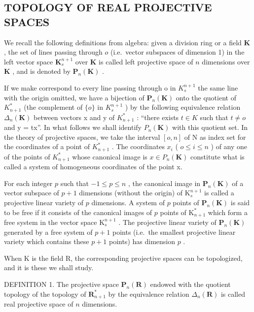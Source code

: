 \subsection{TOPOLOGY OF REAL PROJECTIVE SPACES}

We recall the following definitions from algebra: given a division ring or a field \(\mathbf{K}\) , the set of lines passing through \(o\) (i.e.~vector subspaces of dimension 1) in the left vector space \(\mathbf{K}_s^{n+1}\) over \(\mathbf{K}\) is called left projective space of \(n\) dimensions over \(\mathbf{K}\) , and is denoted by \(\mathbf{P}_n(\mathbf{K})\) .

If we make correspond to every line passing through o in \(K_{s}^{n+1}\) the same line with the origin omitted, we have a bijection of \(\mathbf{P}_{n}(\mathbf{K})\) onto the quotient of \(K_{n+1}^{*}\) (the complement of \(\{o\}\) in \(K_{s}^{n+1}\) ) by the following equivalence relation \(\Delta_{n}(\mathbf{K})\) between vectors x and y of \(K_{n+1}^{*}\) : ``there exists \(t \in K\) such that \(t \neq o\) and y = tx''. In what follows we shall identify \(P_{n}(\mathbf{K})\) with this quotient set. In the theory of projective spaces, we take the interval \([o, n]\) of N as index set for the coordinates of a point of \(K_{n+1}^{*}\) . The coordinates \(x_{i}\) ( \(o \leqslant i \leqslant n\) ) of any one of the points of \(K_{n+1}^{*}\) whose canonical image is \(x \in P_{n}(\mathbf{K})\) constitute what is called a system of homogeneous coordinates of the point x.

For each integer \(p\) such that \(-1 \leqslant p \leqslant n\) , the canonical image in \(\mathbf{P}_n(\mathbf{K})\) of a vector subspace of \(p + 1\) dimensions (without the origin) of \(\mathrm{K}_s^{n+1}\) is called a projective linear variety of \(p\) dimensions. A system of \(p\) points of \(\mathbf{P}_n(\mathbf{K})\) is said to be free if it consists of the canonical images of \(p\) points of \(\mathrm{K}_{n+1}^*\) which form a free system in the vector space \(\mathrm{K}_s^{n+1}\) . The projective linear variety of \(\mathbf{P}_n(\mathbf{K})\) generated by a free system of \(p + 1\) points (i.e.~the smallest projective linear variety which contains these \(p + 1\) points) has dimension \(p\) .

When K is the field R, the corresponding projective spaces can be topologized, and it is these we shall study.

DEFINITION 1. The projective space \(\mathbf{P}_n(\mathbf{R})\) endowed with the quotient topology of the topology of \(\mathbf{R}_{n+1}^*\) by the equivalence relation \(\Delta_n(\mathbf{R})\) is called real projective space of \(n\) dimensions.

